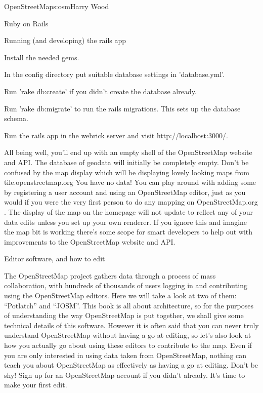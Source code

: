 \begin{aosachapter}{OpenStreetMap}{s:osm}{Harry Wood}
\begin{aosasect1}{Ruby on Rails}
\begin{aosasect2}{Running (and developing) the rails app}
\begin{aosaitemize}
\item Install the needed gems.

\item In the config directory put suitable database settings in
  'database.yml'.

\item Run 'rake db:create' if you didn't create the database already.

\item Run 'rake db:migrate' to run the rails migrations. This sets up
  the database schema.

\item Run the rails app in the webrick server and visit
  http://localhost:3000/.

\end{aosaitemize}

All being well, you'll end up with an empty shell of the OpenStreetMap
website and API. The database of geodata will initially be completely
empty. Don't be confused by the map display which will be displaying
lovely looking maps from tile.openstreetmap.org You have no data! You
can play around with adding some by registering a user account and
using an OpenStreetMap editor, just as you would if you were the very
first person to do any mapping on OpenStreetMap.org . The display of
the map on the homepage will not update to reflect any of your data
edits unless you set up your own renderer. If you ignore this and
imagine the map bit is working there's some scope for smart developers
to help out with improvements to the OpenStreetMap website and API.

\end{aosasect2}

\end{aosasect1}

\begin{aosasect1}{Editor software, and how to edit}

The OpenStreetMap project gathers data through a process of mass
collaboration, with hundreds of thousands of users logging in and
contributing using the OpenStreetMap editors. Here we will take a look
at two of them: ``Potlatch'' and ``JOSM''. This book is all about
architecture, so for the purposes of understanding the way
OpenStreetMap is put together, we shall give some technical details of
this software. However it is often said that you can never truly
understand OpenStreetMap without having a go at editing, so let's also
look at how you actually go about using these editors to contribute to
the map. Even if you are only interested in using data taken from
OpenStreetMap, nothing can teach you about OpenStreetMap as
effectively as having a go at editing. Don't be shy! Sign up for an
OpenStreetMap account if you didn't already. It's time to make your
first edit.


\end{aosasect1}
\end{aosachapter}
